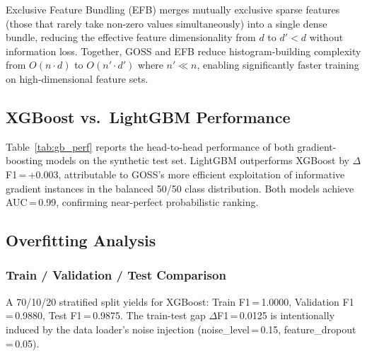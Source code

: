\documentclass[5p, times]{elsarticle}
\begin{document}
Exclusive Feature Bundling (EFB) merges mutually exclusive sparse features (those that rarely take non-zero values simultaneously) into a single dense bundle, reducing the effective feature dimensionality from $d$ to $d'<d$ without information loss. Together, GOSS and EFB reduce histogram-building complexity from $O(n\cdot d)$ to $O(n'\cdot d')$ where $n' \ll n$, enabling
significantly faster training on high-dimensional feature sets.

\subsection{XGBoost vs.\ LightGBM Performance}

Table~\ref{tab:gb_perf} reports the head-to-head performance of both gradient-boosting models on the synthetic test set. LightGBM outperforms XGBoost by $\Delta$F1\,=\,+0.003, attributable to GOSS's more efficient exploitation of informative gradient instances in the balanced 50/50 class distribution. Both models achieve AUC\,=\,0.99, confirming near-perfect probabilistic ranking.

\begin{table}[h!]
\centering
\caption{Gradient boosting performance on synthetic test set}
\label{tab:gb_perf}
\end{table}

\subsection{Overfitting Analysis}

\subsubsection{Train / Validation / Test Comparison}
A 70/10/20 stratified split yields for XGBoost: Train F1\,=\,1.0000, Validation F1\,=\,0.9880, Test F1\,=\,0.9875. The train-test gap $\Delta$F1\,=\,0.0125 is intentionally induced by the data loader's noise injection (noise\_level\,=\,0.15,
feature\_dropout\,=\,0.05).
\end{document}
